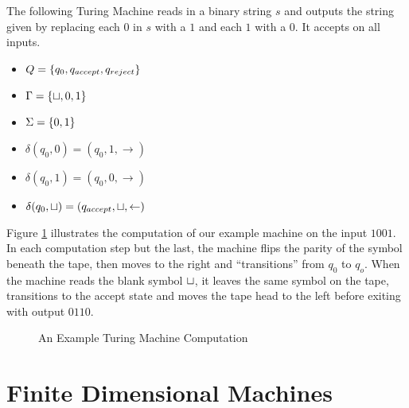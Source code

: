 \begin{example}{}

  The following Turing Machine reads in a binary string $s$ and
  outputs the string given by replacing each $0$ in $s$ with a $1$ and
  each $1$ with a $0$.  It accepts on all inputs.

  \begin{itemize}
  \item $Q = \{q_0, q_{accept}, q_{reject}\}$
  \item $\Gamma = \{\sqcup, 0, 1\}$
  \item $\Sigma = \{0,1\}$
  \item $\delta(q_0, 0) = (q_0, 1, \rightarrow)$
  \item $\delta(q_0, 1) = (q_0, 0, \rightarrow)$
  \item $\delta(q_0, \sqcup) = (q_{accept}, \sqcup, \leftarrow)$
  \end{itemize}

  Figure \ref{fig:turing-example} illustrates the computation of our
  example machine on the input $1001$. In each computation step but
  the last, the machine flips the parity of the symbol beneath the
  tape, then moves to the right and ``transitions'' from $q_0$ to
  $q_o$.  When the machine reads the blank symbol $\sqcup$, it leaves
  the same symbol on the tape, transitions to the accept state and
  moves the tape head to the left before exiting with output $0110$.

  \begin{figure}[p]
    \begin{center}
       \vspace{1mm}
       \vspace{1mm}
       \vspace{1mm}
       \vspace{1mm}
       \vspace{1mm}
       \vspace{1mm}
    \end{center}
    \caption{An Example Turing Machine Computation}
    \label{fig:turing-example}
  \end{figure}
\end{example}

\section{Finite Dimensional Machines}

